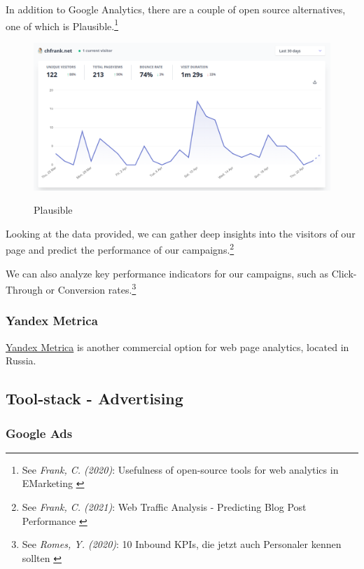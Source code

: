 In addition to Google Analytics, there are a couple of open source alternatives, one of which is Plausible.\footnote{See \textit{Frank, C. (2020)}: Usefulness of open-source tools for web analytics in EMarketing \cite{previousPaper}} 

\begin{figure}[H]
\centering
\caption {Plausible}
\includegraphics[width=\linewidth]{images/plausible.png}
\label{fig:plausible}
\end{figure}

Looking at the data provided, we can gather deep insights into the visitors of our page and predict the performance of our campaigns.\footnote{See \textit{Frank, C. (2021)}: Web Traffic Analysis - Predicting Blog Post Performance \cite{previousBigdata}}

We can also analyze key performance indicators for our campaigns, such as Click-Through or Conversion rates.\footnote{See \textit{Romes, Y. (2020)}: 10 Inbound KPIs, die jetzt auch Personaler kennen sollten \cite{inboundKPI}}

\subsubsection{Yandex Metrica}

\href{https://metrica.yandex.com/}{Yandex Metrica} is another commercial option for web page analytics, located in Russia.

\subsection{Tool-stack - Advertising}

\subsubsection{Google Ads}

